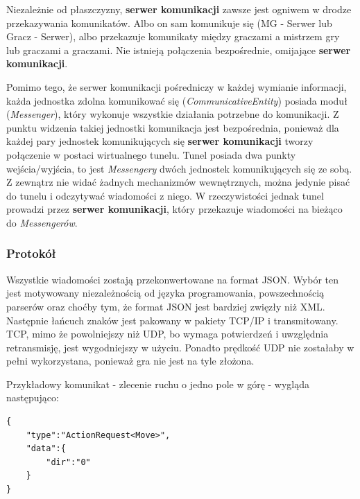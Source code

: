 \documentclass[11pt]{article}
\let\Oldsubsubsection\subsubsection
\renewcommand{\subsubsection}{\FloatBarrier\Oldsubsubsection}
\begin{document}
\par
Niezależnie od płaszczyzny, \textbf{serwer komunikacji} zawsze jest ogniwem w drodze przekazywania komunikatów. Albo on sam komunikuje się (MG - Serwer lub Gracz - Serwer), albo przekazuje komunikaty między graczami a mistrzem gry lub graczami a graczami. Nie istnieją połączenia bezpośrednie, omijające \textbf{serwer komunikacji}.
\par
Pomimo tego, że serwer komunikacji pośredniczy w każdej wymianie informacji, każda jednostka zdolna komunikować się (\textit{CommunicativeEntity}) posiada moduł (\textit{Messenger}), który wykonuje wszystkie działania potrzebne do komunikacji. Z punktu widzenia takiej jednostki komunikacja jest bezpośrednia, ponieważ dla każdej pary jednostek komunikujących się \textbf{serwer komunikacji} tworzy połączenie w postaci wirtualnego tunelu. Tunel posiada dwa punkty wejścia/wyjścia, to jest \textit{Messengery} dwóch jednostek komunikujących się ze sobą. Z zewnątrz nie widać żadnych mechanizmów wewnętrznych, można jedynie pisać do tunelu i odczytywać wiadomości z niego. W rzeczywistości jednak tunel prowadzi przez \textbf{serwer komunikacji}, który przekazuje wiadomości na bieżąco do \textit{Messengerów}.

\subsubsection{Protokół}
\par
Wszystkie wiadomości zostają przekonwertowane na format JSON. Wybór ten jest motywowany niezależnością od języka programowania, powszechnością parserów oraz choćby tym, że format JSON jest bardziej zwięzły niż XML. Następnie łańcuch znaków jest pakowany w pakiety TCP/IP i transmitowany. TCP, mimo że powolniejszy niż UDP, bo wymaga potwierdzeń i uwzględnia retransmisję, jest wygodniejszy w użyciu. Ponadto prędkość UDP nie zostałaby w pełni wykorzystana, ponieważ gra nie jest na tyle złożona.
\par
Przykładowy komunikat - zlecenie ruchu o jedno pole w górę - wygląda następująco:
\begin{lstlisting}
{ 
	"type":"ActionRequest<Move>",
	"data":{
		"dir":"0"
	}
}
\end{lstlisting}
\end{document}
